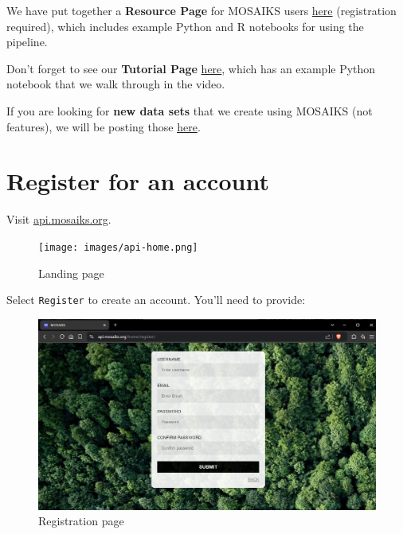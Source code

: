 \documentclass[
  letterpaper,
  DIV=11,
  numbers=noendperiod]{scrreprt}
\begin{document}
We have put together a \textbf{Resource Page} for MOSAIKS users
\href{https://api.mosaiks.org/portal/resources/}{here} (registration
required), which includes example Python and R notebooks for using the
pipeline.

Don't forget to see our \textbf{Tutorial Page}
\href{https://www.mosaiks.org/tutorials}{here}, which has an example
Python notebook that we walk through in the video.

If you are looking for \textbf{new data sets} that we create using
MOSAIKS (not features), we will be posting those
\href{https://www.mosaiks.org/data-sets}{here}.

\hypertarget{register-for-an-account}{%
\section{Register for an account}\label{register-for-an-account}}

Visit \href{https://api.mosaiks.org/}{api.mosaiks.org}.

\begin{figure}

{\centering \texttt{[image: images/api-home.png]}

}

\caption{Landing page}

\end{figure}

Select \texttt{Register} to create an account. You'll need to provide:

\begin{figure}

{\centering \includegraphics{images/api-register.png}

}

\caption{Registration page}

\end{figure}
\end{document}
